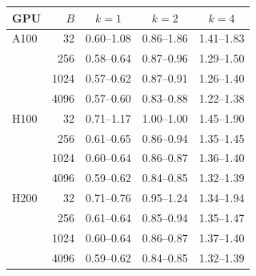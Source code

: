\begin{tabular}{lrccc}
\toprule
GPU & $B$ & $k{=}1$ & $k{=}2$ & $k{=}4$ \\
\midrule
A100 & 32 & 0.60--1.08 & 0.86--1.86 & 1.41--1.83 \\
 & 256 & 0.58--0.64 & 0.87--0.96 & 1.29--1.50 \\
 & 1024 & 0.57--0.62 & 0.87--0.91 & 1.26--1.40 \\
 & 4096 & 0.57--0.60 & 0.83--0.88 & 1.22--1.38 \\
\midrule
H100 & 32 & 0.71--1.17 & 1.00--1.00 & 1.45--1.90 \\
 & 256 & 0.61--0.65 & 0.86--0.94 & 1.35--1.45 \\
 & 1024 & 0.60--0.64 & 0.86--0.87 & 1.36--1.40 \\
 & 4096 & 0.59--0.62 & 0.84--0.85 & 1.32--1.39 \\
\midrule
H200 & 32 & 0.71--0.76 & 0.95--1.24 & 1.34--1.94 \\
 & 256 & 0.61--0.64 & 0.85--0.94 & 1.35--1.47 \\
 & 1024 & 0.60--0.64 & 0.86--0.87 & 1.37--1.40 \\
 & 4096 & 0.59--0.62 & 0.84--0.85 & 1.32--1.39 \\
\bottomrule
\end{tabular}%
